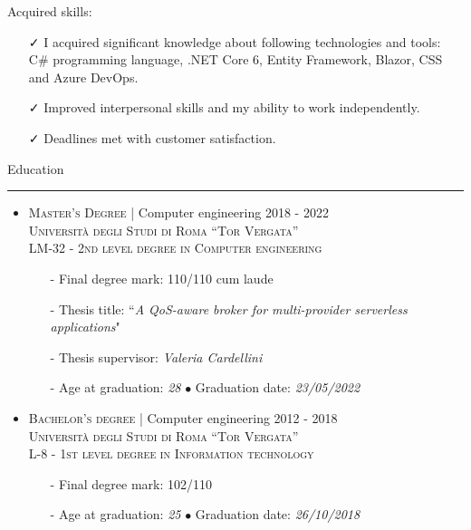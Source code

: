 \documentclass[english,10pt,a4paper]{article}
\newcommand{\Color}[1]{\textcolor{CvColor}{#1}}
\newcommand{\CompanyName}[1]{\textsc{{\small #1}}}
\newcommand{\JobTimeRange}[1]{{\scriptsize \textcolor{CvColor!50}{\faCalendar*} \hspace{0.01cm} \textcolor{CvIcon}{#1}}}
\newcommand{\CvBullet}{\hspace{0.05cm} \textcolor{CvColor}{$\bullet$} \hspace{0.05cm}}
\newcommand{\CvCheck}{\textcolor{CvColor}{\faCheck}}
\newcommand{\CvSection}[2]{
	\hspace{0.25cm}\textcolor{CvColor!50}{#1} \hspace{0.01cm} \textcolor{CvColor!80}{#2}\\
	\textcolor{CvColor}{\rule[.7\baselineskip]{\textwidth}{1pt}}}
\begin{document}
\begin{paracol}{2}
\begin{tcolorbox}[colback=white, height=\textheight, colframe=white, left=0cm]
\begin{itemize}
{\begin{itemize}
					
					\textcolor{CvColor}{Acquired skills:}
					\begin{itemize}
						\item[\CvCheck] I acquired significant knowledge about following technologies and tools: \Color{C\#} programming language, \Color{.NET Core 6}, \Color{Entity Framework}, \Color{Blazor}, \Color{CSS} and \Color{Azure DevOps}.
						\item[\CvCheck] Improved interpersonal skills and my ability to work independently.
						\item[\CvCheck] Deadlines met with customer satisfaction. 
					\end{itemize}						
				\end{itemize}
			}
		
		
		
		
	\end{itemize}
	
\CvSection{\faGraduationCap}{Education}
\begin{itemize}
	\item \CompanyName{Master’s Degree} \textcolor{CvColor}{|} {\scriptsize Computer engineering} \hfill \JobTimeRange{2018 - 2022}\\
	{\scriptsize \textcolor{CvIcon}{\textsc{Università degli Studi di Roma ``Tor Vergata''}}} \\
	{\scriptsize \textcolor{CvIcon}{\textsc{LM-32 - 2nd level degree in Computer engineering}}}
	{\scriptsize \begin{itemize}
		\item[-] Final degree mark: \textcolor{CvColor}{110/110 cum laude}
		\item[-] Thesis title: ``\textit{A QoS-aware broker for multi-provider serverless applications}"
		\item[-] Thesis supervisor: \textit{Valeria Cardellini}
		\item[-] Age at graduation: \textit{28} \CvBullet Graduation date: \textit{23/05/2022}	
	\end{itemize}}
	
	\vspace*{0.2cm}
	
	\item \CompanyName{Bachelor's degree} \textcolor{CvColor}{|} {\scriptsize Computer engineering} \hfill \JobTimeRange{2012 - 2018}\\
	{\scriptsize \textcolor{CvIcon}{\textsc{Università degli Studi di Roma ``Tor Vergata''}}} \\
	{\scriptsize \textcolor{CvIcon}{\textsc{L-8 - 1st level degree in Information technology}}}
	{\scriptsize \begin{itemize}
			\item[-] Final degree mark: \textcolor{CvColor}{102/110}
			\item[-] Age at graduation: \textit{25} \CvBullet Graduation date: \textit{26/10/2018}	
	\end{itemize}}


\end{itemize}
\end{tcolorbox}
\end{paracol}
\end{document}
